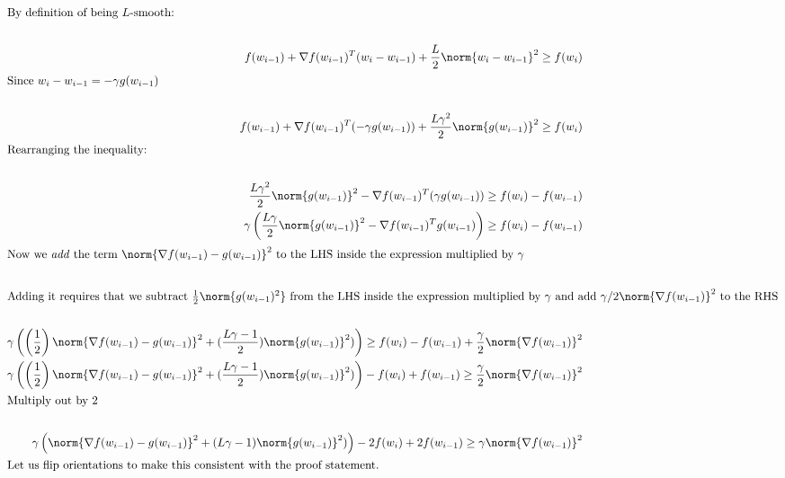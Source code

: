 \documentclass[../main.tex]{subfiles}
\begin{document}
\begin{align*}
    \intertext{By definition of being $L$-smooth:} \\
    f(w_{i-1}) + \nabla f(w_{i-1})^T(w_{i} - w_{i-1}) + \frac{L}{2}\norm{w_{i} - w_{i-1}}^2 \geq f(w_i) \\
    \intertext{Since $w_{i} - w_{i-1} = -\gamma g(w_{i-1})$} \\
    f(w_{i-1}) + \nabla f(w_{i-1})^T(-\gamma g(w_{i-1})) + \frac{L\gamma^2}{2}\norm{g(w_{i-1})}^2 \geq f(w_i) \\
    \intertext{Rearranging the inequality:} \\
    \frac{L\gamma^2}{2}\norm{g(w_{i-1})}^2  - \nabla f(w_{i-1})^T(\gamma g(w_{i-1}))  \geq f(w_i) - f(w_{i-1}) \\
    \gamma \left(\frac{L\gamma}{2}\norm{g(w_{i-1})}^2  - \nabla f(w_{i-1})^T g(w_{i-1})\right)  \geq f(w_i) - f(w_{i-1}) \\
    \intertext{Now we \textit{add} the term $\norm{\nabla f(w_{i-1}) - g(w_{i-1})}^2$ to the LHS inside the expression multiplied by $\gamma$}\\
    \intertext{Adding it requires that we subtract $\frac{1}{2}\norm{g(w_{i-1})^2}$ from the LHS inside the expression multiplied by $\gamma$ and add $\gamma/2 \norm{\nabla f(w_{i-1})}^2$ to the RHS}\\
    \gamma \left( \left(\frac{1}{2}\right)\norm{\nabla f(w_{i-1}) - g(w_{i-1})}^2 + (\frac{L\gamma - 1}{2})\norm{g(w_{i-1})}^2)\right)  \geq f(w_i) - f(w_{i-1}) + \frac{\gamma}{2}\norm{\nabla f(w_{i-1})}^2 \\
    \gamma \left( \left(\frac{1}{2}\right)\norm{\nabla f(w_{i-1}) - g(w_{i-1})}^2 + (\frac{L\gamma - 1}{2})\norm{g(w_{i-1})}^2)\right) - f(w_i) + f(w_{i-1}) \geq\frac{\gamma}{2}\norm{\nabla f(w_{i-1})}^2 \\
    \intertext{Multiply out by $2$} \\
    \gamma \left( \norm{\nabla f(w_{i-1}) - g(w_{i-1})}^2 + (L\gamma - 1)\norm{g(w_{i-1})}^2)\right) - 2f(w_i) + 2f(w_{i-1}) \geq \gamma\norm{\nabla f(w_{i-1})}^2 \\
    \intertext{Let us flip orientations to make this consistent with the proof statement.} \\
\end{align*}
\end{document}
